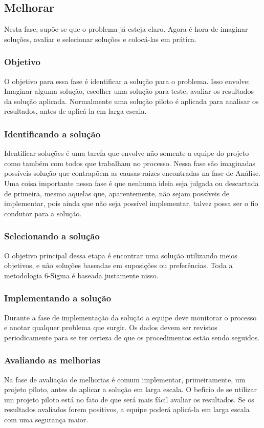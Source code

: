 \documentclass{abnt}
\begin{document}
				\subsection {Melhorar}
				Nesta fase, supõe-se que o problema já esteja claro. Agora é hora de imaginar soluções, avaliar e 
				selecionar soluções e colocá-las em prática.
					\subsubsection {Objetivo}
					O objetivo para essa fase é identificar a solução para o problema. Isso envolve: 
					Imaginar alguma solução, escolher uma solução para teste, avaliar os resultados da solução aplicada.
					Normalmente uma solução piloto é aplicada para analisar os resultados, antes de aplicá-la em larga escala.
					\subsubsection {Identificando a solução}
					Identificar soluções é uma tarefa que envolve não somente a equipe do projeto como também com todos que trabalham no processo. 
					Nessa fase são imaginadas possíveis solução que contrapõem as causas-raizes encontradas na fase de Análise.
					Uma coisa importante nessa fase é que nenhuma ideia seja julgada ou descartada de primeira, mesmo aquelas que, aparentemente, não sejam 
					possíveis de implementar, pois ainda que não seja possível implementar, talvez possa ser o fio condutor para a solução.
					\subsubsection {Selecionando a solução}
					O objetivo principal dessa etapa é encontrar uma solução utilizando meios objetivos, e não soluções 
					baseadas em suposições ou preferências. Toda a metodologia 6-Sigma é baseada justamente nisso.
					\subsubsection {Implementando a solução}
					Durante a fase de implementação da solução a equipe deve monitorar o processo e anotar qualquer problema que surgir.
					Os dados devem ser revistos periodicamente para se ter certeza de que os procedimentos estão sendo seguidos.
					\subsubsection {Avaliando as melhorias}
					Na fase de avaliação de melhorias é comum implementar, primeiramente, um projeto piloto, antes de aplicar a solução 
					em larga escala. O befício de se utilizar um projeto piloto está no fato de que será mais fácil avaliar os resultados. 
					Se os resultados avaliados forem positivos, a equipe poderá aplicá-la em larga escala com uma segurança maior.
\end{document}
